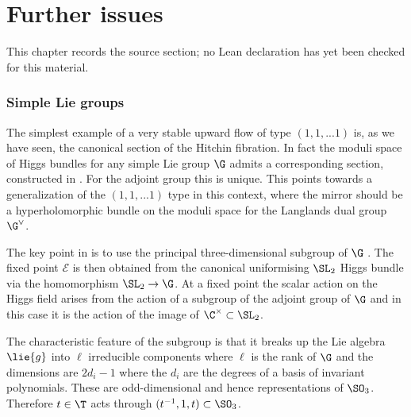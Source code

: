 \chapter{Further issues}
\label{very-stable-higgs-bundles-equivariant-multiplicity-mirror-symmetry-chapter-08}

\begin{remark}
\label{very-stable-higgs-bundles-equivariant-multiplicity-mirror-symmetry-chapter-08-source}
This chapter records the source section; no Lean declaration has yet been checked for this material.
\notready
\end{remark}

\label{further}


\subsection{Simple Lie groups}\label{simple}
The simplest example of a very stable upward flow of type $(1,1,...1)$ is, as we have seen, the canonical section of the Hitchin fibration. In fact  the moduli space of Higgs bundles for any simple Lie group $\G$ admits   a corresponding section, constructed in \cite{hitchin-lie}. For the adjoint group this is unique. This points towards a generalization of the $(1,1,...1)$ type in this context, where the mirror should be a hyperholomorphic bundle on the moduli space for the Langlands dual group $\G^{\vee}$.

The key point in \cite{hitchin-lie} is to use the principal three-dimensional subgroup of $\G$ \cite{Kos}. The fixed point $\mathcal E$ is then obtained from the canonical uniformising $\SL_2$ Higgs bundle  via the homomorphism $\SL_2\rightarrow \G$. At a fixed point  the scalar action on the Higgs field arises from the action of a subgroup of the adjoint  group of  $\G$ and in this case it is the  action of the image of $\C^\times\subset \SL_2$.

The characteristic feature of the subgroup is that it breaks up the Lie algebra $\lie{g}$ into $\ell$ irreducible components where $\ell$ is the rank of $\G$ and the dimensions are $2d_i-1$ where the $d_i$ are the degrees of a basis of invariant polynomials. These are odd-dimensional and hence representations of $\SO_3$. Therefore $t   \in \T$ acts through $(t^{-1},1,t)\subset \SO_3$.

